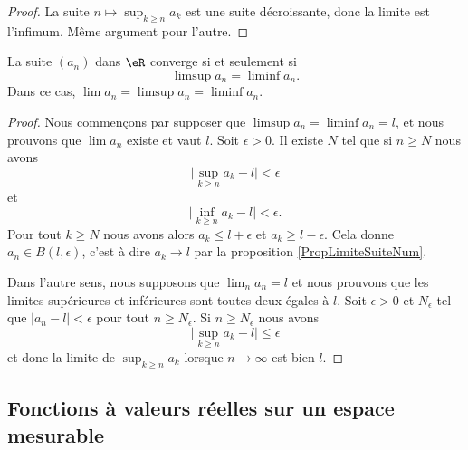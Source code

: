 \begin{proof}
    La suite \( n\mapsto \sup_{k\geq n}a_k\) est une suite décroissante, donc la limite est l'infimum. Même argument pour l'autre.
\end{proof}

\begin{lemma}       \label{ooIQIKooXWwAmM}
    La suite \( (a_n)\) dans \( \eR\) converge si et seulement si
    \begin{equation}
        \limsup a_n=\liminf a_n.
    \end{equation}
    Dans ce cas, \( \lim a_n=\limsup a_n=\liminf a_n\).
\end{lemma}

\begin{proof}
    Nous commençons par supposer que \( \limsup a_n=\liminf a_n=l\), et nous prouvons que \( \lim a_n\) existe et vaut \( l\). Soit \( \epsilon>0\). Il existe \( N\) tel que si \( n\geq N\) nous avons
    \begin{equation}
        \big| \sup_{k\geq n}a_k-l \big|<\epsilon
    \end{equation}
    et
    \begin{equation}
        \big| \inf_{k\geq n}a_k-l \big|<\epsilon.
    \end{equation}
    Pour tout \( k\geq N\) nous avons alors \( a_k\leq l+\epsilon\) et \( a_k\geq l-\epsilon\). Cela donne \( a_n\in B(l,\epsilon)\), c'est à dire \( a_k\to l\) par la proposition \ref{PropLimiteSuiteNum}.

    Dans l'autre sens, nous supposons que \( \lim_n a_n=l\) et nous prouvons que les limites supérieures et inférieures sont toutes deux égales à \( l\). Soit \( \epsilon>0\) et \( N_{\epsilon}\) tel que \( | a_n-l |<\epsilon\) pour tout \( n\geq N_{\epsilon}\). Si \( n\geq N_{\epsilon}\) nous avons
    \begin{equation}
        \big| \sup_{k\geq n}a_k-l \big|\leq \epsilon
    \end{equation}
    et donc la limite de \( \sup_{k\geq n}a_k\) lorsque \( n\to \infty\) est bien \(l\).
\end{proof}

\subsection{Fonctions à valeurs réelles sur un espace mesurable}

